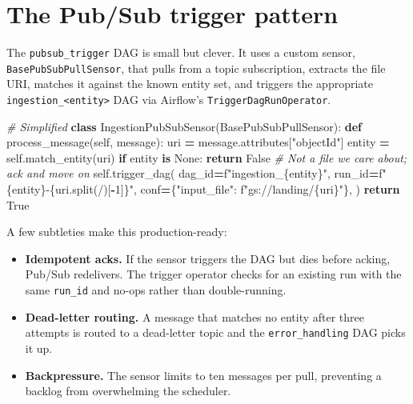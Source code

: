 \documentclass[
  11pt,
  british,
  oneside]{book}
\newenvironment{Shaded}{\begin{snugshade}}{\end{snugshade}}
\newcommand{\CommentTok}[1]{\textcolor[rgb]{0.56,0.35,0.01}{\textit{#1}}}
\newcommand{\ControlFlowTok}[1]{\textcolor[rgb]{0.13,0.29,0.53}{\textbf{#1}}}
\newcommand{\DecValTok}[1]{\textcolor[rgb]{0.00,0.00,0.81}{#1}}
\newcommand{\KeywordTok}[1]{\textcolor[rgb]{0.13,0.29,0.53}{\textbf{#1}}}
\newcommand{\NormalTok}[1]{#1}
\newcommand{\OperatorTok}[1]{\textcolor[rgb]{0.81,0.36,0.00}{\textbf{#1}}}
\newcommand{\SpecialCharTok}[1]{\textcolor[rgb]{0.00,0.00,0.00}{#1}}
\newcommand{\SpecialStringTok}[1]{\textcolor[rgb]{0.31,0.60,0.02}{#1}}
\newcommand{\StringTok}[1]{\textcolor[rgb]{0.31,0.60,0.02}{#1}}
\newcommand{\VariableTok}[1]{\textcolor[rgb]{0.00,0.00,0.00}{#1}}
\providecommand{\tightlist}{%
  \setlength{\itemsep}{0pt}\setlength{\parskip}{0pt}}
\begin{document}
\hypertarget{the-pubsub-trigger-pattern}{%
\section{The Pub/Sub trigger pattern}\label{the-pubsub-trigger-pattern}}

The \texttt{pubsub\_trigger} DAG is small but clever. It uses a custom
sensor, \texttt{BasePubSubPullSensor}, that pulls from a topic
subscription, extracts the file URI, matches it against the known entity
set, and triggers the appropriate
\texttt{ingestion\_\textless{}entity\textgreater{}} DAG via Airflow's
\texttt{TriggerDagRunOperator}.

\begin{Shaded}
\begin{Highlighting}[]
\CommentTok{\# Simplified}
\KeywordTok{class}\NormalTok{ IngestionPubSubSensor(BasePubSubPullSensor):}
    \KeywordTok{def}\NormalTok{ process\_message(}\VariableTok{self}\NormalTok{, message):}
\NormalTok{        uri }\OperatorTok{=}\NormalTok{ message.attributes[}\StringTok{"objectId"}\NormalTok{]}
\NormalTok{        entity }\OperatorTok{=} \VariableTok{self}\NormalTok{.match\_entity(uri)}
        \ControlFlowTok{if}\NormalTok{ entity }\KeywordTok{is} \VariableTok{None}\NormalTok{:}
            \ControlFlowTok{return} \VariableTok{False}  \CommentTok{\# Not a file we care about; ack and move on}
        \VariableTok{self}\NormalTok{.trigger\_dag(}
\NormalTok{            dag\_id}\OperatorTok{=}\SpecialStringTok{f"ingestion\_}\SpecialCharTok{\{}\NormalTok{entity}\SpecialCharTok{\}}\SpecialStringTok{"}\NormalTok{,}
\NormalTok{            run\_id}\OperatorTok{=}\SpecialStringTok{f"}\SpecialCharTok{\{}\NormalTok{entity}\SpecialCharTok{\}}\SpecialStringTok{{-}}\SpecialCharTok{\{}\NormalTok{uri}\SpecialCharTok{.}\NormalTok{split(}\StringTok{\textquotesingle{}/\textquotesingle{}}\NormalTok{)[}\OperatorTok{{-}}\DecValTok{1}\NormalTok{]}\SpecialCharTok{\}}\SpecialStringTok{"}\NormalTok{,}
\NormalTok{            conf}\OperatorTok{=}\NormalTok{\{}\StringTok{"input\_file"}\NormalTok{: }\SpecialStringTok{f"gs://landing/}\SpecialCharTok{\{}\NormalTok{uri}\SpecialCharTok{\}}\SpecialStringTok{"}\NormalTok{\},}
\NormalTok{        )}
        \ControlFlowTok{return} \VariableTok{True}
\end{Highlighting}
\end{Shaded}

A few subtleties make this production-ready:

\begin{itemize}
\tightlist
\item
  \textbf{Idempotent acks.} If the sensor triggers the DAG but dies
  before acking, Pub/Sub redelivers. The trigger operator checks for an
  existing run with the same \texttt{run\_id} and no-ops rather than
  double-running.
\item
  \textbf{Dead-letter routing.} A message that matches no entity after
  three attempts is routed to a dead-letter topic and the
  \texttt{error\_handling} DAG picks it up.
\item
  \textbf{Backpressure.} The sensor limits to ten messages per pull,
  preventing a backlog from overwhelming the scheduler.
\end{itemize}
\end{document}
